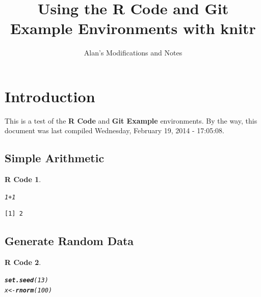 \documentclass{article}\usepackage[]{graphicx}\usepackage[]{color}
\title{Using the \textbf{R Code} and {\bfseries{Git Example}} Environments with \textbf{knitr}}
\author{Alan's Modifications and Notes}
\makeatletter
\newcommand{\hlnum}[1]{\textcolor[rgb]{0.686,0.059,0.569}{#1}}%
\newcommand{\hlopt}[1]{\textcolor[rgb]{0,0,0}{#1}}%
\newcommand{\hlstd}[1]{\textcolor[rgb]{0.345,0.345,0.345}{#1}}%
\newcommand{\hlkwb}[1]{\textcolor[rgb]{0.69,0.353,0.396}{#1}}%
\newcommand{\hlkwd}[1]{\textcolor[rgb]{0.737,0.353,0.396}{\textbf{#1}}}%
\newenvironment{kframe}{%
 \def\at@end@of@kframe{}%
 \ifinner\ifhmode%
  \def\at@end@of@kframe{\end{minipage}}%
  \begin{minipage}{\columnwidth}%
 \fi\fi%
 \def\FrameCommand##1{\hskip\@totalleftmargin \hskip-\fboxsep
 \colorbox{shadecolor}{##1}\hskip-\fboxsep
     \hskip-\linewidth \hskip-\@totalleftmargin \hskip\columnwidth}%
 \MakeFramed {\advance\hsize-\width
   \@totalleftmargin\z@ \linewidth\hsize
   \@setminipage}}%
 {\par\unskip\endMakeFramed%
 \at@end@of@kframe}
\newenvironment{knitrout}{}{} %
\theoremstyle{rcode}
\newtheorem{rcode}{R Code}[section]
\makeatother
\begin{document}
\maketitle





\section{Introduction}

This is a test of the \textbf{R Code} and \textbf{Git Example} environments.  By the way,
this document was last compiled Wednesday, February 19, 2014 - 17:05:08.

\subsection{Simple Arithmetic}

\begin{knitrout}
\color{fgcolor}\begin{kframe}
\begin{rcode}\label{test-a}\hfill{}\begin{alltt}
\hlnum{1} \hlopt{+} \hlnum{1}
\end{alltt}
\begin{verbatim}
[1] 2
\end{verbatim}
\end{rcode}\end{kframe}
\end{knitrout}



\subsection{Generate Random Data}

\begin{knitrout}
\color{fgcolor}\begin{kframe}
\begin{rcode}\label{test-b}\hfill{}\begin{alltt}
\hlkwd{set.seed}\hlstd{(}\hlnum{13}\hlstd{)}
\hlstd{x} \hlkwb{<-} \hlkwd{rnorm}\hlstd{(}\hlnum{100}\hlstd{)}
\end{alltt}
\end{rcode}\end{kframe}
\end{knitrout}
\end{document}
